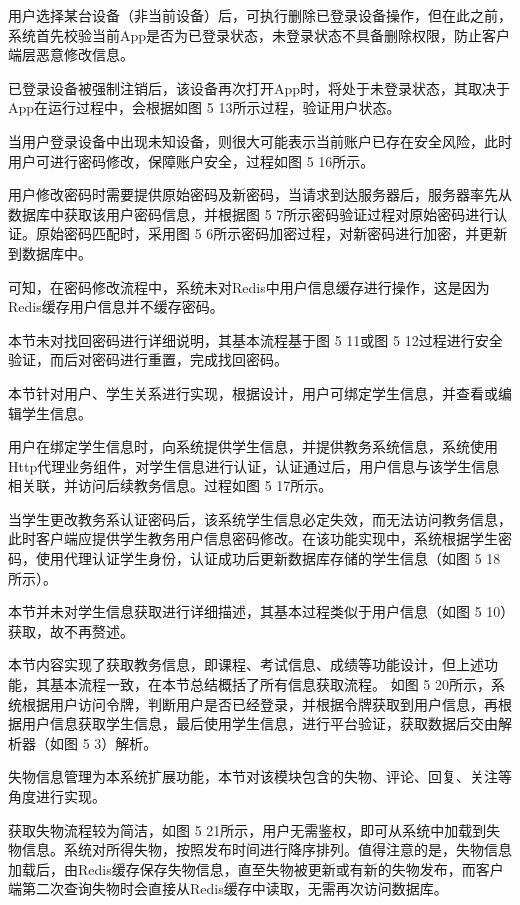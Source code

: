 \documentclass[oneside]{jufethesis}
\begin{document}
用户选择某台设备（非当前设备）后，可执行删除已登录设备操作，但在此之前，系统首先校验当前App是否为已登录状态，未登录状态不具备删除权限，防止客户端层恶意修改信息。

已登录设备被强制注销后，该设备再次打开App时，将处于未登录状态，其取决于App在运行过程中，会根据如图 5 13所示过程，验证用户状态。
 
当用户登录设备中出现未知设备，则很大可能表示当前账户已存在安全风险，此时用户可进行密码修改，保障账户安全，过程如图 5 16所示。

用户修改密码时需要提供原始密码及新密码，当请求到达服务器后，服务器率先从数据库中获取该用户密码信息，并根据图 5 7所示密码验证过程对原始密码进行认证。原始密码匹配时，采用图 5 6所示密码加密过程，对新密码进行加密，并更新到数据库中。

可知，在密码修改流程中，系统未对Redis中用户信息缓存进行操作，这是因为Redis缓存用户信息并不缓存密码。
 
本节未对找回密码进行详细说明，其基本流程基于图 5 11或图 5 12过程进行安全验证，而后对密码进行重置，完成找回密码。

本节针对用户、学生关系进行实现，根据设计，用户可绑定学生信息，并查看或编辑学生信息。

用户在绑定学生信息时，向系统提供学生信息，并提供教务系统信息，系统使用Http代理业务组件，对学生信息进行认证，认证通过后，用户信息与该学生信息相关联，并访问后续教务信息。过程如图 5 17所示。

当学生更改教务系认证密码后，该系统学生信息必定失效，而无法访问教务信息，此时客户端应提供学生教务用户信息密码修改。在该功能实现中，系统根据学生密码，使用代理认证学生身份，认证成功后更新数据库存储的学生信息（如图 5 18所示）。
 
本节并未对学生信息获取进行详细描述，其基本过程类似于用户信息（如图 5 10）获取，故不再赘述。

本节内容实现了获取教务信息，即课程、考试信息、成绩等功能设计，但上述功能，其基本流程一致，在本节总结概括了所有信息获取流程。
如图 5 20所示，系统根据用户访问令牌，判断用户是否已经登录，并根据令牌获取到用户信息，再根据用户信息获取学生信息，最后使用学生信息，进行平台验证，获取数据后交由解析器（如图 5 3）解析。
 
失物信息管理为本系统扩展功能，本节对该模块包含的失物、评论、回复、关注等角度进行实现。

获取失物流程较为简洁，如图 5 21所示，用户无需鉴权，即可从系统中加载到失物信息。系统对所得失物，按照发布时间进行降序排列。值得注意的是，失物信息加载后，由Redis缓存保存失物信息，直至失物被更新或有新的失物发布，而客户端第二次查询失物时会直接从Redis缓存中读取，无需再次访问数据库。
\end{document}
